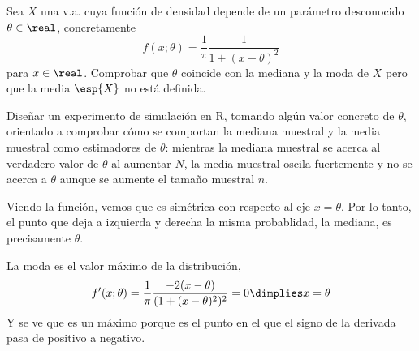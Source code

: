 \begin{problem}[5] Sea $X$ una v.a. cuya función de densidad depende de un parámetro desconocido $\theta \in \real$, concretamente
\[ f(x;\theta) = \frac{1}{\pi}\frac{1}{1+(x-\theta)^2} \]
para $x\in \real$. Comprobar que $\theta$ coincide con la mediana y la moda de $X$ pero que la media $\esp{X}$ no está definida.

Diseñar un experimento de simulación en R, tomando algún valor concreto de $\theta$, orientado a comprobar cómo se comportan la mediana muestral y la media muestral como estimadores de $\theta$: mientras la mediana muestral se acerca al verdadero valor de $\theta$ al aumentar $N$, la media muestral oscila fuertemente y no se acerca a $\theta$ aunque se aumente el tamaño muestral $n$.

\solution Viendo la función, vemos que es simétrica con respecto al eje $x= \theta$. Por lo tanto, el punto que deja a izquierda y derecha la misma probablidad, la mediana, es precisamente $\theta$. 

La moda es el valor máximo de la distribución,
\[ f'(x;\theta) = \frac{1}{\pi} \frac{-2(x-\theta)}{(1+(x-\theta)^2)^2} = 0 \dimplies x = \theta \]
Y se ve que es un máximo porque es el punto en el que el signo de la derivada pasa de positivo a negativo.
\end{problem}

